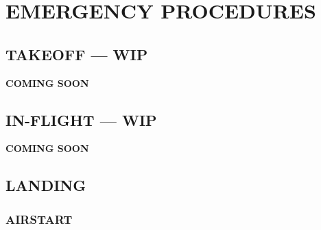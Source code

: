 \chapter[EMERGENCY]{EMERGENCY PROCEDURES}
\localtableofcontents
\thispagestyle{plain}
\cleardoublepage

\section{TAKEOFF --- WIP}

\begin{center}
    \vspace{4em}%
    \Large\titlefont%
    \textbf{COMING SOON}%
\end{center}

\clearpage

\section{IN-FLIGHT --- WIP}

\begin{center}
    \vspace{4em}%
    \Large\titlefont%
    \textbf{COMING SOON}%
\end{center}

\clearpage

\section{LANDING}

\marginfigeometry

\subsection{AIRSTART}

